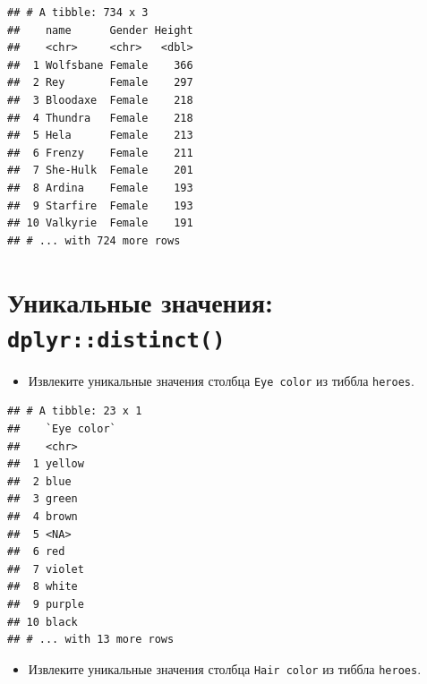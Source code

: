 \documentclass[]{book}
\newenvironment{Shaded}{\begin{snugshade}}{\end{snugshade}}
\newcommand{\KeywordTok}[1]{\textcolor[rgb]{0.13,0.29,0.53}{\textbf{#1}}}
\newcommand{\DataTypeTok}[1]{\textcolor[rgb]{0.13,0.29,0.53}{#1}}
\newcommand{\StringTok}[1]{\textcolor[rgb]{0.31,0.60,0.02}{#1}}
\newcommand{\OperatorTok}[1]{\textcolor[rgb]{0.81,0.36,0.00}{\textbf{#1}}}
\newcommand{\NormalTok}[1]{#1}
\providecommand{\tightlist}{%
  \setlength{\itemsep}{0pt}\setlength{\parskip}{0pt}}
\begin{document}
\begin{verbatim}
## # A tibble: 734 x 3
##    name      Gender Height
##    <chr>     <chr>   <dbl>
##  1 Wolfsbane Female    366
##  2 Rey       Female    297
##  3 Bloodaxe  Female    218
##  4 Thundra   Female    218
##  5 Hela      Female    213
##  6 Frenzy    Female    211
##  7 She-Hulk  Female    201
##  8 Ardina    Female    193
##  9 Starfire  Female    193
## 10 Valkyrie  Female    191
## # ... with 724 more rows
\end{verbatim}

\section{\texorpdfstring{Уникальные значения:
\texttt{dplyr::distinct()}}{Уникальные значения: dplyr::distinct()}}\label{solution_dist}

\begin{itemize}
\tightlist
\item
  Извлеките уникальные значения столбца \texttt{Eye\ color} из тиббла
  \texttt{heroes}.
\end{itemize}

\begin{Shaded}
\end{Shaded}

\begin{verbatim}
## # A tibble: 23 x 1
##    `Eye color`
##    <chr>      
##  1 yellow     
##  2 blue       
##  3 green      
##  4 brown      
##  5 <NA>       
##  6 red        
##  7 violet     
##  8 white      
##  9 purple     
## 10 black      
## # ... with 13 more rows
\end{verbatim}

\begin{itemize}
\tightlist
\item
  Извлеките уникальные значения столбца \texttt{Hair\ color} из тиббла
  \texttt{heroes}.
\end{itemize}

\begin{Shaded}
\end{Shaded}
\end{document}
